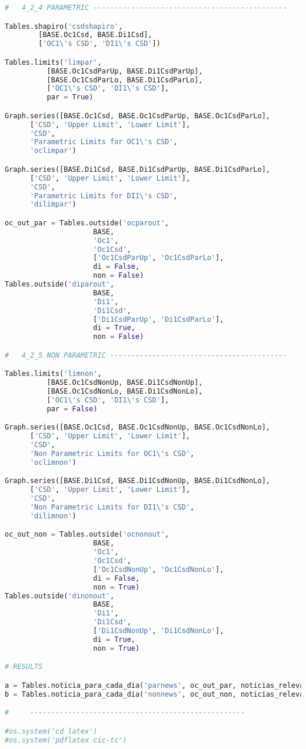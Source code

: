 \begin{lstlisting}[language=Python]
#   4_2_4 PARAMETRIC ----------------------------------------------

Tables.shapiro('csdshapiro',
        [BASE.Oc1Csd, BASE.Di1Csd],
        ['OC1\'s CSD', 'DI1\'s CSD'])

Tables.limits('limpar',
          [BASE.Oc1CsdParUp, BASE.Di1CsdParUp],
          [BASE.Oc1CsdParLo, BASE.Di1CsdParLo],
          ['OC1\'s CSD', 'DI1\'s CSD'],
          par = True)

Graph.series([BASE.Oc1Csd, BASE.Oc1CsdParUp, BASE.Oc1CsdParLo],
      ['CSD', 'Upper Limit', 'Lower Limit'],
      'CSD',
      'Parametric Limits for OC1\'s CSD',
      'oclimpar')

Graph.series([BASE.Di1Csd, BASE.Di1CsdParUp, BASE.Di1CsdParLo],
      ['CSD', 'Upper Limit', 'Lower Limit'],
      'CSD',
      'Parametric Limits for DI1\'s CSD',
      'dilimpar')

oc_out_par = Tables.outside('ocparout',
                     BASE,
                     'Oc1',
                     'Oc1Csd',
                     ['Oc1CsdParUp', 'Oc1CsdParLo'],
                     di = False,
                     non = False)
Tables.outside('diparout',
                     BASE,
                     'Di1',
                     'Di1Csd',
                     ['Di1CsdParUp', 'Di1CsdParLo'],
                     di = True,
                     non = False)

#   4_2_5 NON PARAMETRIC ------------------------------------------

Tables.limits('limnon',
          [BASE.Oc1CsdNonUp, BASE.Di1CsdNonUp],
          [BASE.Oc1CsdNonLo, BASE.Di1CsdNonLo],
          ['OC1\'s CSD', 'DI1\'s CSD'],
          par = False)

Graph.series([BASE.Oc1Csd, BASE.Oc1CsdNonUp, BASE.Oc1CsdNonLo],
      ['CSD', 'Upper Limit', 'Lower Limit'],
      'CSD',
      'Non Parametric Limits for OC1\'s CSD',
      'oclimnon')

Graph.series([BASE.Di1Csd, BASE.Di1CsdNonUp, BASE.Di1CsdNonLo],
      ['CSD', 'Upper Limit', 'Lower Limit'],
      'CSD',
      'Non Parametric Limits for DI1\'s CSD',
      'dilimnon')

oc_out_non = Tables.outside('ocnonout',
                     BASE,
                     'Oc1',
                     'Oc1Csd',
                     ['Oc1CsdNonUp', 'Oc1CsdNonLo'],
                     di = False,
                     non = True)
Tables.outside('dinonout',
                     BASE,
                     'Di1',
                     'Di1Csd',
                     ['Di1CsdNonUp', 'Di1CsdNonLo'],
                     di = True,
                     non = True)

# RESULTS

a = Tables.noticia_para_cada_dia('parnews', oc_out_par, noticias_relevantes)
b = Tables.noticia_para_cada_dia('nonnews', oc_out_non, noticias_relevantes)

#     ---------------------------------------------------

#os.system('cd latex')
#os.system('pdflatex cic-tc')


\end{lstlisting}
